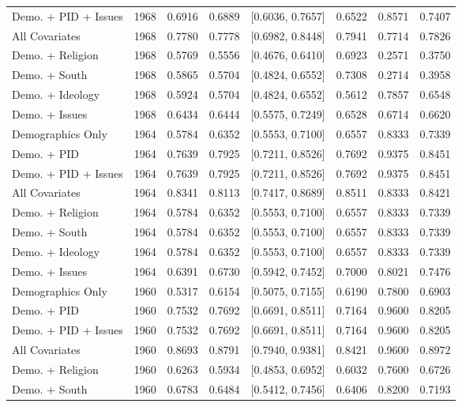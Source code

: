 \begin{longtable}{lrrrlrrr}
  Demo. + PID + Issues & 1968 & 0.6916 & 0.6889 & [0.6036, 0.7657] & 0.6522 & 0.8571 & 0.7407 \\ 
  All Covariates & 1968 & 0.7780 & 0.7778 & [0.6982, 0.8448] & 0.7941 & 0.7714 & 0.7826 \\ 
  Demo. + Religion & 1968 & 0.5769 & 0.5556 & [0.4676, 0.6410] & 0.6923 & 0.2571 & 0.3750 \\ 
  Demo. + South & 1968 & 0.5865 & 0.5704 & [0.4824, 0.6552] & 0.7308 & 0.2714 & 0.3958 \\ 
  Demo. + Ideology & 1968 & 0.5924 & 0.5704 & [0.4824, 0.6552] & 0.5612 & 0.7857 & 0.6548 \\ 
  Demo. + Issues & 1968 & 0.6434 & 0.6444 & [0.5575, 0.7249] & 0.6528 & 0.6714 & 0.6620 \\ 
  Demographics Only & 1964 & 0.5784 & 0.6352 & [0.5553, 0.7100] & 0.6557 & 0.8333 & 0.7339 \\ 
  Demo. + PID & 1964 & 0.7639 & 0.7925 & [0.7211, 0.8526] & 0.7692 & 0.9375 & 0.8451 \\ 
  Demo. + PID + Issues & 1964 & 0.7639 & 0.7925 & [0.7211, 0.8526] & 0.7692 & 0.9375 & 0.8451 \\ 
  All Covariates & 1964 & 0.8341 & 0.8113 & [0.7417, 0.8689] & 0.8511 & 0.8333 & 0.8421 \\ 
  Demo. + Religion & 1964 & 0.5784 & 0.6352 & [0.5553, 0.7100] & 0.6557 & 0.8333 & 0.7339 \\ 
  Demo. + South & 1964 & 0.5784 & 0.6352 & [0.5553, 0.7100] & 0.6557 & 0.8333 & 0.7339 \\ 
  Demo. + Ideology & 1964 & 0.5784 & 0.6352 & [0.5553, 0.7100] & 0.6557 & 0.8333 & 0.7339 \\ 
  Demo. + Issues & 1964 & 0.6391 & 0.6730 & [0.5942, 0.7452] & 0.7000 & 0.8021 & 0.7476 \\ 
  Demographics Only & 1960 & 0.5317 & 0.6154 & [0.5075, 0.7155] & 0.6190 & 0.7800 & 0.6903 \\ 
  Demo. + PID & 1960 & 0.7532 & 0.7692 & [0.6691, 0.8511] & 0.7164 & 0.9600 & 0.8205 \\ 
  Demo. + PID + Issues & 1960 & 0.7532 & 0.7692 & [0.6691, 0.8511] & 0.7164 & 0.9600 & 0.8205 \\ 
  All Covariates & 1960 & 0.8693 & 0.8791 & [0.7940, 0.9381] & 0.8421 & 0.9600 & 0.8972 \\ 
  Demo. + Religion & 1960 & 0.6263 & 0.5934 & [0.4853, 0.6952] & 0.6032 & 0.7600 & 0.6726 \\ 
  Demo. + South & 1960 & 0.6783 & 0.6484 & [0.5412, 0.7456] & 0.6406 & 0.8200 & 0.7193 \\ 

\end{longtable}
